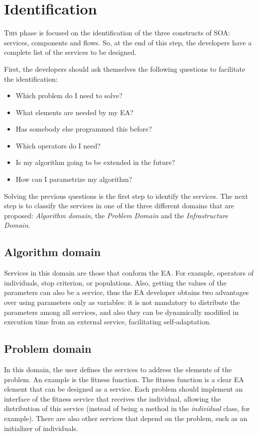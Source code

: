 \section{Identification}
\label{subsec:soaea:identification}

\lettrine{T}{his} phase is focused on the identification of the three constructs of SOA: services, components and flows. So, at the end of this step, the developers have a complete list of the services to be designed.

First, the developers should ask themselves the following questions to facilitate the identification:
\begin{itemize}
\item Which problem do I need to solve?
\item What elements are needed by my EA?
\item Has somebody else programmed this before?
\item Which operators do I need?
\item Is my algorithm going to be extended in the future?
\item How can I parametrize my algorithm?
\end{itemize}

Solving the previous questions is the first step to identify the services. The next step is to classify the services in one of the three different domains that are proposed: {\em Algorithm domain}, the {\em Problem Domain} and the {\em Infrastructure Domain}. 

\subsection{Algorithm domain} Services in this domain are those that conform the EA. For example, operators of individuals, stop criterion, or populations.
 Also, getting the values of the parameters can also be a
  service,  thus the EA developer obtains two advantages over using parameters only as variables: 
it is not mandatory to distribute the parameters among all services, and also they can be dynamically modified in execution time from an external service, facilitating self-adaptation.

\subsection{Problem domain} In this domain, the user defines the services to address the elements of the problem. An example is the fitness function. The fitness function is a clear EA element that can be designed as a service. Each problem should implement an interface
  of the fitness service that receives the individual, allowing the
  distribution of this service (instead of being a method in the {\em individual} class, for example). There are also other services that depend on the problem, such as an initializer of individuals.

